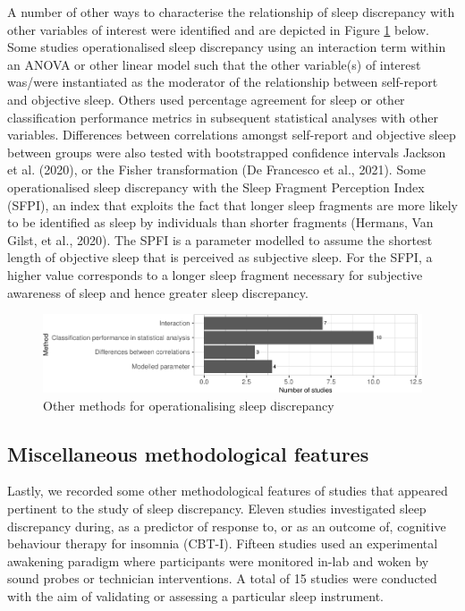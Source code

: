 \documentclass[
]{article}
\begin{document}
A number of other ways to characterise the relationship of sleep discrepancy with other variables of interest were identified and are depicted in Figure \ref{fig:otherm} below. Some studies operationalised sleep discrepancy using an interaction term within an ANOVA or other linear model such that the other variable(s) of interest was/were instantiated as the moderator of the relationship between self-report and objective sleep. Others used percentage agreement for sleep or other classification performance metrics in subsequent statistical analyses with other variables. Differences between correlations amongst self-report and objective sleep between groups were also tested with bootstrapped confidence intervals Jackson et al. (2020), or the Fisher transformation (De Francesco et al., 2021). Some operationalised sleep discrepancy with the Sleep Fragment Perception Index (SFPI), an index that exploits the fact that longer sleep fragments are more likely to be identified as sleep by individuals than shorter fragments (Hermans, Van Gilst, et al., 2020). The SPFI is a parameter modelled to assume the shortest length of objective sleep that is perceived as subjective sleep. For the SFPI, a higher value corresponds to a longer sleep fragment necessary for subjective awareness of sleep and hence greater sleep discrepancy.

\begin{figure}
\centering
\includegraphics{review_markdown_files/figure-latex/otherm-1.pdf}
\caption{\label{fig:otherm}Other methods for operationalising sleep discrepancy}
\end{figure}

\subsection{Miscellaneous methodological features}\label{miscellaneous-methodological-features}

Lastly, we recorded some other methodological features of studies that appeared pertinent to the study of sleep discrepancy. Eleven studies investigated sleep discrepancy during, as a predictor of response to, or as an outcome of, cognitive behaviour therapy for insomnia (CBT-I). Fifteen studies used an experimental awakening paradigm where participants were monitored in-lab and woken by sound probes or technician interventions. A total of 15 studies were conducted with the aim of validating or assessing a particular sleep instrument.
\end{document}
